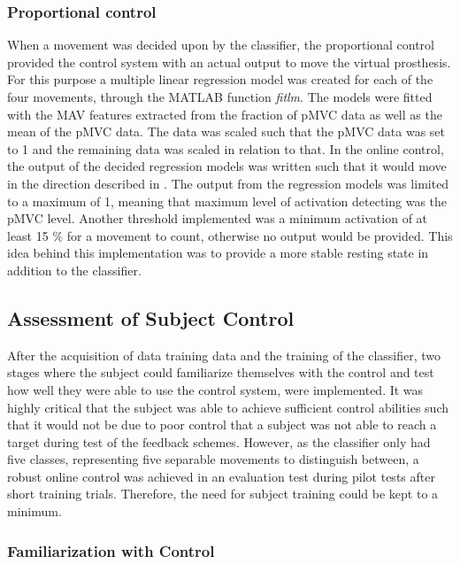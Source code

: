 \subsubsection{Proportional control}  
When a movement was decided upon by the classifier, the proportional control provided the control system with an actual output to move the virtual prosthesis. For this purpose a multiple linear regression model was created for each of the four movements, through the MATLAB function \textit{fitlm}. The models were fitted with the MAV features extracted from the fraction of pMVC data as well as the mean of the pMVC data. The data was scaled such that the pMVC data was set to 1 and the remaining data was scaled in relation to that. In the online control, the output of the decided regression models was written such that it would move in the direction described in . The output from the regression models was limited to a maximum of 1, meaning that maximum level of activation detecting was the pMVC level.  Another threshold implemented was a minimum activation of at least 15 $\percent$ for a movement to count, otherwise no output would be provided. This idea behind this implementation was to provide a more stable resting state in addition to the classifier. 


\subsection{Assessment of Subject Control}

After the acquisition of data training data and the training of the classifier, two stages where the subject could familiarize themselves with the control and test how well they were able to use the control system, were implemented. It was highly critical that the subject was able to achieve sufficient control abilities such that it would not be due to poor control that a subject was not able to reach a target during test of the feedback schemes. However, as the classifier only had five classes, representing five separable movements to distinguish between, a robust online control was achieved in an evaluation test during pilot tests after short training trials. Therefore, the need for subject training could be kept to a minimum.  

\subsubsection{Familiarization with Control}

